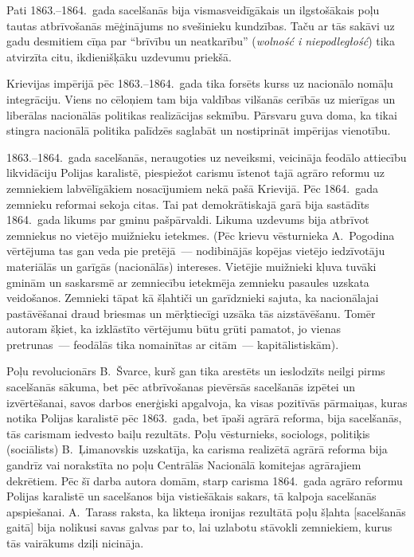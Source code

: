 \documentclass[twoside,a5paper,12pt,fleqn,openany]{extbook}
\newcommand{\pltxti}[1]{\textit{\textpolish{#1}}}
\begin{document}
Pati 1863.--1864.~gada sacelšanās bija vismasveidīgākais un ilgstošākais poļu tautas atbrīvošanās mēģinājums no svešinieku kundzības. Taču ar tās sakāvi uz gadu desmitiem cīņa par ``brīvību un neatkarību'' (\pltxti{wolność i niepodległość}) tika atvirzīta citu, ikdienišķāku uzdevumu priekšā.

Krievijas impērijā pēc 1863.--1864.~gada tika forsēts kurss uz nacionālo nomāļu integrāciju. Viens no cēloņiem tam bija valdības vilšanās cerībās uz mierīgas un liberālas nacionālās politikas realizācijas sekmību. Pārsvaru guva doma, ka tikai stingra nacionālā politika palīdzēs saglabāt un nostiprināt impērijas vienotību.

1863.--1864.~gada sacelšanās, neraugoties uz neveiksmi, veicināja feodālo attiecību likvidāciju Polijas karalistē, piespiežot carismu īstenot tajā agrāro reformu uz zemniekiem labvēlīgākiem nosacījumiem nekā pašā Krievijā. Pēc 1864.~gada zemnieku reformai sekoja citas. Tai pat demokrātiskajā garā bija sastādīts 1864.~gada likums par gminu pašpārvaldi. Likuma uzdevums bija atbrīvot zemniekus no vietējo muižnieku ietekmes. (Pēc krievu vēsturnieka A.~Pogodina vērtējuma tas gan veda pie pretējā~--- nodibinājās kopējas vietējo iedzīvotāju materiālās un garīgās (nacionālās) intereses. Vietējie muižnieki kļuva tuvāki gminām un saskarsmē ar zemniecību ietekmēja zemnieku pasaules uzskata veidošanos. Zemnieki tāpat kā šļahtiči un garīdznieki sajuta, ka nacionālajai pastāvēšanai draud briesmas un mērķtiecīgi uzsāka tās aizstāvēšanu. Tomēr autoram šķiet, ka izklāstīto vērtējumu būtu grūti pamatot, jo vienas pretrunas~--- feodālās tika nomainītas ar citām~--- kapitālistiskām).

Poļu revolucionārs B.~Švarce, kurš gan tika arestēts un ieslodzīts neilgi pirms sacelšanās sākuma, bet pēc atbrīvošanas pievērsās sacelšanās izpētei un izvērtēšanai, savos darbos enerģiski apgalvoja, ka visas pozitīvās pārmaiņas, kuras notika Polijas karalistē pēc 1863.~gada, bet īpaši agrārā reforma, bija sacelšanās, tās carismam iedvesto baiļu rezultāts. Poļu vēsturnieks, sociologs, politiķis (sociālists) B.~Ļimanovskis uzskatīja, ka carisma realizētā agrārā reforma bija gandrīz vai norakstīta no poļu Centrālās Nacionālā komitejas agrārajiem dekrētiem. Pēc šī darba autora domām, starp carisma 1864.~gada agrāro reformu Polijas karalistē un sacelšanos bija vistiešākais sakars, tā kalpoja sacelšanās apspiešanai. A.~Tarass raksta, ka likteņa ironijas rezultātā poļu šļahta [sacelšanās gaitā] bija nolikusi savas galvas par to, lai uzlabotu stāvokli zemniekiem, kurus tās vairākums dziļi nicināja.
\end{document}
